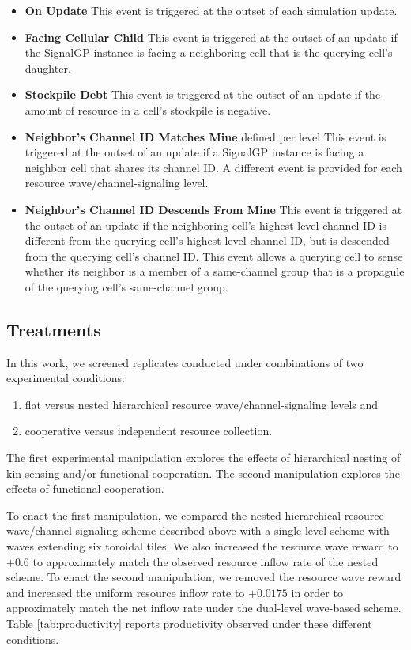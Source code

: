 \begin{itemize}
\item \textbf{On Update}
This event is triggered at the outset of each simulation update.
\item \textbf{Facing Cellular Child}
This event is triggered at the outset of an update if the SignalGP instance is facing a neighboring cell that is the querying cell's daughter.
\item \textbf{Stockpile Debt}
This event is triggered at the outset of an update if the amount of resource in a cell's stockpile is negative.
\item \textbf{Neighbor's Channel ID Matches Mine} defined per level
This event is triggered at the outset of an update if a SignalGP instance is facing a neighbor cell that shares its channel ID.
A different event is provided for each resource wave/channel-signaling level.
\item \textbf{Neighbor's Channel ID Descends From Mine}
This event is triggered at the outset of an update if the neighboring cell's highest-level channel ID is different from the querying cell's highest-level channel ID, but is descended from the querying cell's channel ID.
This event allows a querying cell to sense whether its neighbor is a member of a same-channel group that is a propagule of the querying cell's same-channel group.
\end{itemize}

\subsection{Treatments}

In this work, we screened replicates conducted under combinations of two experimental conditions:
\begin{enumerate}
\item flat versus nested hierarchical resource wave/channel-signaling levels and
\item cooperative versus independent resource collection.
\end{enumerate}

The first experimental manipulation explores the effects of hierarchical nesting of kin-sensing and/or functional cooperation.
The second manipulation explores the effects of functional cooperation.

To enact the first manipulation, we compared the nested hierarchical resource wave/channel-signaling scheme described above with a single-level scheme with waves extending six toroidal tiles.
We also increased the resource wave reward to $+0.6$ to approximately match the observed resource inflow rate of the nested scheme.
To enact the second manipulation, we removed the resource wave reward and increased the uniform resource inflow rate to $+0.0175$ in order to approximately match the net inflow rate under the dual-level wave-based scheme.
Table \ref{tab:productivity} reports productivity observed under these different conditions.

